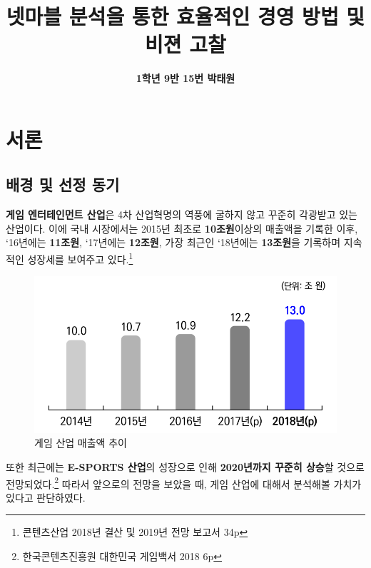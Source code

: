 \documentclass{oblivoir}
\title{\textbf{넷마블 분석을 통한 효율적인 경영 방법 및 비젼 고찰}}
\author{\textbf{1학년 9반 15번 박태원}}
\begin{document}
	\maketitle
	\pagebreak
	
	\begin{center}
	\tableofcontents
	\pagebreak
	\end{center}

	\begin{abstract}
	
	\end{abstract}

	\section{서론}
		\subsection{배경 및 선정 동기}
			\textbf{게임 엔터테인먼트 산업}은 4차 산업혁명의 역풍에 굴하지 않고 꾸준히 각광받고 있는 산업이다. 이에 국내 시장에서는 2015년 최초로 \textbf{10조원}이상의 매출액을 기록한 이후, `16년에는 \textbf{11조원}, `17년에는 \textbf{12조원}, 가장 최근인 `18년에는 \textbf{13조원}을 기록하며 지속적인 성장세를 보여주고 있다.\footnote{콘텐츠산업 2018년 결산 및 2019년 전망 보고서 34p}
			
			\begin{figure}[htbp]
				\centering
				\includegraphics[width=1\textwidth]{GameMaechul.png}
				\caption{게임 산업 매출액 추이}
			\end{figure}
			
			또한 최근에는 \textbf{E-SPORTS 산업}의 성장으로 인해 \textbf{2020년까지 꾸준히 상승}할 것으로 전망되었다.\footnote{한국콘텐츠진흥원 대한민국 게임백서 2018 6p} 
			따라서 앞으로의 전망을 보았을 때, 게임 산업에 대해서 분석해볼 가치가 있다고 판단하였다.
			
\end{document}
